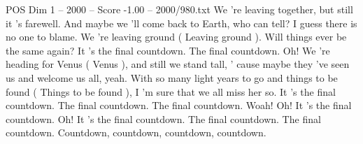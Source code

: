 \begin{textsample}{POS Dim 1 – 2000 – Score -1.00 – 2000/980.txt}  \label{ex:f1_pos_040}
We 're leaving together, but still it 's farewell.
And maybe we 'll come back to Earth, who can tell?
I guess there is no one to blame.
We 're leaving ground ( Leaving ground ).
Will things ever be the same again?
It 's the final countdown.
The final countdown.
Oh!
We 're heading for Venus ( Venus ), and still we stand tall, ' cause maybe they 've seen us and welcome us all, yeah.
With so many light years to go and things to be found ( Things to be found ), I 'm sure that we all miss her so.
It 's the final countdown.
The final countdown.
The final countdown.
Woah!
Oh!
It 's the final countdown.
Oh!
It 's the final countdown.
The final countdown.
The final countdown.
Countdown, countdown, countdown, countdown.

\end{textsample}
